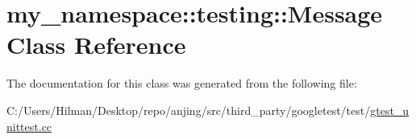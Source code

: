 \hypertarget{classmy__namespace_1_1testing_1_1_message}{}\section{my\+\_\+namespace\+:\+:testing\+:\+:Message Class Reference}
\label{classmy__namespace_1_1testing_1_1_message}


The documentation for this class was generated from the following file\+:\begin{DoxyCompactItemize}
\item 
C\+:/\+Users/\+Hilman/\+Desktop/repo/anjing/src/third\+\_\+party/googletest/test/\hyperlink{gtest__unittest_8cc}{gtest\+\_\+unittest.\+cc}\end{DoxyCompactItemize}
